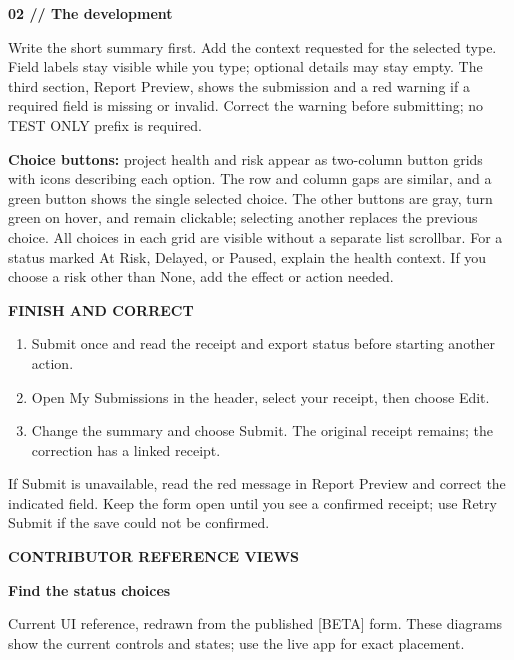 \documentclass[letterpaper,10pt]{article}
\newcommand{\eyebrow}[1]{{\color{Green}\small\bfseries #1}\par\vspace{2pt}}
\newcommand{\titleline}[1]{{\color{Forest}\fontsize{22}{26}\selectfont\bfseries #1}\par\vspace{5pt}}
\newcommand{\subline}[1]{{\color{Muted}\small #1}\par\vspace{9pt}}
\begin{document}
\vspace{5pt}
{\color{Green}\large\bfseries 02 // The development}\par
Write the short summary first. Add the context requested for the selected type. Field labels stay visible while you type; optional details may stay empty. The third section, Report Preview, shows the submission and a red warning if a required field is missing or invalid. Correct the warning before submitting; no TEST ONLY prefix is required.

\begin{note}
\textbf{Choice buttons:} project health and risk appear as two-column button grids with icons describing each option. The row and column gaps are similar, and a green button shows the single selected choice. The other buttons are gray, turn green on hover, and remain clickable; selecting another replaces the previous choice. All choices in each grid are visible without a separate list scrollbar. For a status marked At Risk, Delayed, or Paused, explain the health context. If you choose a risk other than None, add the effect or action needed.
\end{note}

\vspace{4pt}
\eyebrow{FINISH AND CORRECT}
\begin{enumerate}[leftmargin=20pt,itemsep=5pt]
\item Submit once and read the receipt and export status before starting another action.
\item Open My Submissions in the header, select your receipt, then choose Edit.
\item Change the summary and choose Submit. The original receipt remains; the correction has a linked receipt.
\end{enumerate}

If Submit is unavailable, read the red message in Report Preview and correct the indicated field. Keep the form open until you see a confirmed receipt; use Retry Submit if the save could not be confirmed.
\newpage

\eyebrow{CONTRIBUTOR REFERENCE VIEWS}
\titleline{Find the status choices}
\subline{Current UI reference, redrawn from the published [BETA] form. These diagrams show the current controls and states; use the live app for exact placement.}
\end{document}
